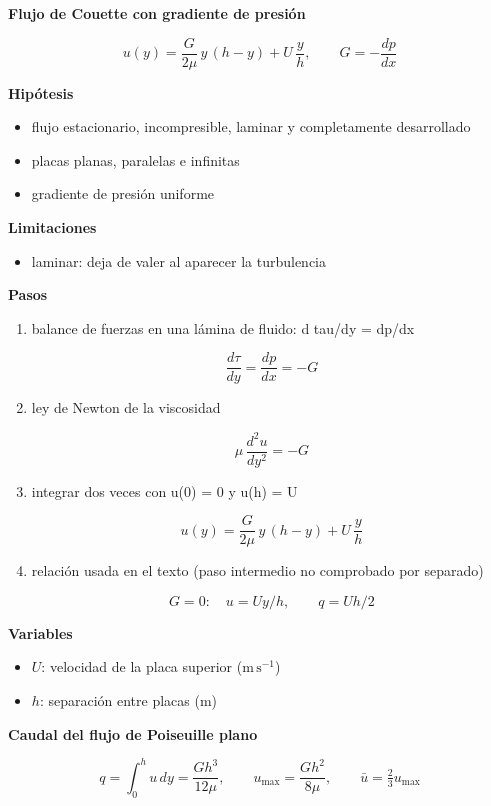 \documentclass[10pt,openany]{book}
\begin{document}
\begin{tcolorbox}[title={Desarrollos del modelo}, studiumdef, breakable]

\noindent\textbf{Flujo de Couette con gradiente de presión}

\[
u(y) = \frac{G}{2\mu}\,y\,(h - y) + U\,\frac{y}{h},\qquad G = -\frac{dp}{dx}
\]

\noindent\textbf{Hipótesis}
\begin{itemize}
\item flujo estacionario, incompresible, laminar y completamente desarrollado
\item placas planas, paralelas e infinitas
\item gradiente de presión uniforme
\end{itemize}

\noindent\textbf{Limitaciones}
\begin{itemize}
\item laminar: deja de valer al aparecer la turbulencia
\end{itemize}

\noindent\textbf{Pasos}
\begin{enumerate}
\item
balance de fuerzas en una lámina de fluido: d tau/dy = dp/dx

\[
\frac{d\tau}{dy} = \frac{dp}{dx} = -G
\]
\item
ley de Newton de la viscosidad

\[
\mu\,\frac{d^{2}u}{dy^{2}} = -G
\]
\item
integrar dos veces con u(0) = 0 y u(h) = U

\[
u(y) = \frac{G}{2\mu}\,y\,(h - y) + U\,\frac{y}{h}
\]
\item
relación usada en el texto (paso intermedio no comprobado por separado)

\[
G = 0:\quad u = Uy/h,\qquad q = Uh/2
\]
\end{enumerate}

\noindent\textbf{Variables}
\begin{itemize}
\item $U$: velocidad de la placa superior ($\mathrm{m}\,\mathrm{s}^{-1}$)
\item $h$: separación entre placas ($\mathrm{m}$)
\end{itemize}



\noindent\textbf{Caudal del flujo de Poiseuille plano}

\begin{equation}
q = \int_0^{h} u\,dy = \frac{G h^{3}}{12\mu},\qquad u_{\max} = \frac{G h^{2}}{8\mu},\qquad \bar u = \tfrac{2}{3}u_{\max}
\label{eq:c06-poiseuille-plano}
\end{equation}


\end{tcolorbox}
\end{document}
